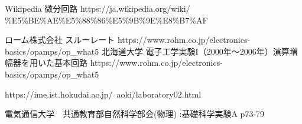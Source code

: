 \documentclass[twocolumn, 10pt,a4j]{jsarticle}
\begin{document}
        


\begin{thebibliography}{3}
\bibitem{}Wikipedia 微分回路 https://ja.wikipedia.org/wiki/ \\ \%E5\%BE\%AE\%E5\%88\%86\%E5\%9B\%9E\%E8\%B7\%AF

\bibitem{}ローム株式会社 スルーレート https://www.rohm.co.jp/electronics-basics/opamps/op\_what5  
\bibitem{}北海道大学 電子工学実験I（2000年～2006年）演算増幅器を用いた基本回路 https://www.rohm.co.jp/electronics-basics/opamps/op\_what5  

https://ime.ist.hokudai.ac.jp/~aoki/laboratory02.html

\bibitem{}電気通信大学　共通教育部自然科学部会(物理) :基礎科学実験A p73-79
\end{thebibliography}
\end{document}
